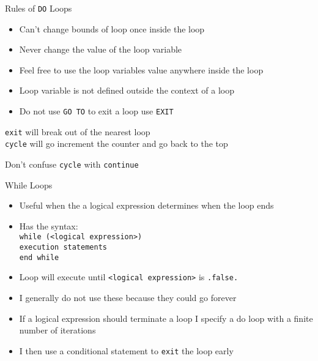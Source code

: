 \documentclass{beamer}
\begin{document}
\begin{frame}{Rules of \texttt{DO} Loops}

  \begin{itemize}
    \item Can't change bounds of loop once inside the loop
    \vfill\item \alert{Never} change the value of the loop variable
    \vfill\item Feel free to use the loop variables value anywhere \alert{inside} the loop
    \vfill\item Loop variable is not defined outside the context of a loop
    \vfill\item Do not use \texttt{GO TO} to exit a loop use \texttt{EXIT}
  \end{itemize}
  \vfill
  \texttt{exit} will break out of the nearest loop \\
  \texttt{cycle} will go increment the counter and go back to the top\\
  {\color{red}\begin{center}{Don't confuse \texttt{cycle} with \texttt{continue}}\end{center}}
\end{frame}
\begin{frame}{While Loops}

  \begin{itemize}

    \item Useful when the a logical expression determines when the loop ends
    \vfill\item Has the syntax: \\
    \vfill
    \hspace{2cm}  \texttt{while (<logical expression>)} \\
      \hspace{2.5cm} \texttt{execution statements} \\
    \hspace{2cm} \texttt{end while}
    \vfill\item Loop will execute until \texttt{<logical expression>} is \texttt{.false.}
    \vfill\item I generally do not use these because they could go forever
    \vfill\item If a logical expression should terminate a loop I specify a do loop with a finite number of iterations
    \vfill\item I then use a conditional statement to \texttt{exit} the loop early

  \end{itemize}

\end{frame}
\end{document}
